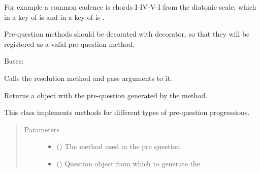 \documentclass[letterpaper,10pt,english]{sphinxmanual}
\begin{document}
For example a common cadence is chords I-IV-V-I from the diatonic scale, which
in a key of  is  and in a key of  is .

Pre-question methods should be decorated with 
decorator, so that they will be registered as a valid pre-question method.

\begin{fulllineitems}
\label{\detokenize{birdears:birdears.prequestion.PreQuestion}}
Bases: 

\begin{fulllineitems}
\label{\detokenize{birdears:birdears.prequestion.PreQuestion.__call__}}
Calls the resolution method and pass arguments to it.

Returns a  object with the pre-question generated by
the method.

\end{fulllineitems}


\begin{fulllineitems}
\label{\detokenize{birdears:birdears.prequestion.PreQuestion.__init__}}
This class implements methods for different types of pre-question
progressions.
\begin{quote}\begin{description}
\item[{Parameters}] \leavevmode\begin{itemize}
\item {} 
 () \textendash{} The method used in the pre question.

\item {} 
 () \textendash{} Question object from which to generate the


\end{itemize}
\end{description}
\end{quote}
\end{fulllineitems}
\end{fulllineitems}
\end{document}
